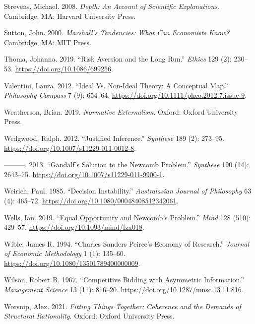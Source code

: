\documentclass[
  12pt,
  letterpaper,
  DIV=11,
  numbers=noendperiod]{scrreprt}
\newlength{\cslhangindent}
\newenvironment{CSLReferences}[2] %
 {\begin{list}{}{%
  \setlength{\itemindent}{0pt}
  \setlength{\leftmargin}{0pt}
  \setlength{\parsep}{0pt}
  \ifodd #1
   \setlength{\leftmargin}{\cslhangindent}
   \setlength{\itemindent}{-1\cslhangindent}
  \fi
  \setlength{\itemsep}{#2\baselineskip}}}
 {\end{list}}
\begin{document}
\begin{CSLReferences}{1}{0}
Strevens, Michael. 2008. \emph{Depth: An Account of Scientific
Explanations}. Cambridge, MA: Harvard University Press.

Sutton, John. 2000. \emph{Marshall's Tendencies: What Can Economists
Know?} Cambridge, MA: {MIT} Press.

Thoma, Johanna. 2019. {``Risk Aversion and the Long Run.''}
\emph{Ethics} 129 (2): 230--53. \url{https://doi.org/10.1086/699256}.

Valentini, Laura. 2012. {``Ideal Vs. Non-Ideal Theory: A Conceptual
Map.''} \emph{Philosophy Compass} 7 (9): 654--64.
\url{https://doi.org/10.1111/phco.2012.7.issue-9}.

Weatherson, Brian. 2019. \emph{Normative Externalism}. Oxford: Oxford
University Press.

Wedgwood, Ralph. 2012. {``Justified Inference.''} \emph{Synthese} 189
(2): 273--95. \url{https://doi.org/10.1007/s11229-011-0012-8}.

---------. 2013. {``Gandalf's Solution to the Newcomb Problem.''}
\emph{Synthese} 190 (14): 2643--75.
\url{https://doi.org/10.1007/s11229-011-9900-1}.

Weirich, Paul. 1985. {``Decision Instability.''} \emph{Australasian
Journal of Philosophy} 63 (4): 465--72.
\url{https://doi.org/10.1080/00048408512342061}.

Wells, Ian. 2019. {``Equal Opportunity and Newcomb's Problem.''}
\emph{Mind} 128 (510): 429--57.
\url{https://doi.org/10.1093/mind/fzx018}.

Wible, James R. 1994. {``Charles Sanders Peirce's Economy of
Research.''} \emph{Journal of Economic Methodology} 1 (1): 135--60.
\url{https://doi.org/10.1080/13501789400000009}.

Wilson, Robert B. 1967. {``Competitive Bidding with Asymmetric
Information.''} \emph{Management Science} 13 (11): 816--20.
\url{https://doi.org/10.1287/mnsc.13.11.816}.

Worsnip, Alex. 2021. \emph{Fitting Things Together: Coherence and the
Demands of Structural Rationality}. Oxford: Oxford University Press.


\end{CSLReferences}
\end{document}
